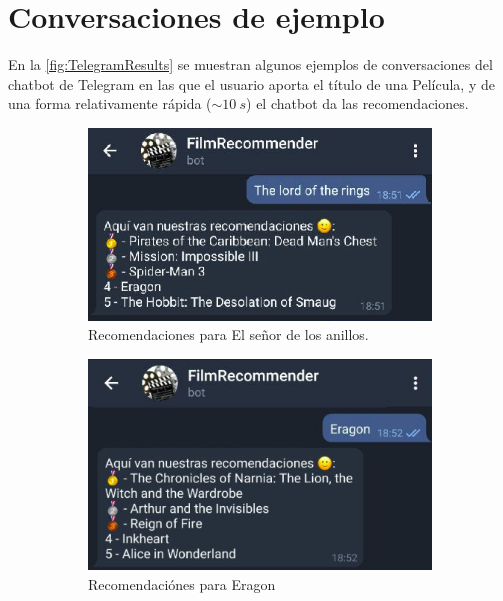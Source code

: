 \section{Conversaciones de ejemplo}

En la \autoref{fig:TelegramResults} se muestran algunos ejemplos de conversaciones del chatbot de Telegram en las que el usuario aporta el título de una Película, y de una forma relativamente rápida ($\sim 10\ s$) el chatbot da las recomendaciones.\\


\begin{figure}[H]
\begin{subfigure}{.5\textwidth}
  \centering
  \includegraphics[width=.9\linewidth]{contenido/imagenes/sc1.png}
  \caption{Recomendaciones para El señor de los anillos.}
  \label{fig:sc1}
\end{subfigure}%
\begin{subfigure}{.5\textwidth}
  \centering
  \includegraphics[width=.9\linewidth]{contenido/imagenes/sc2.png}
  \caption{Recomendaciónes para Eragon}
  \label{fig:sc2}
\end{subfigure}
\\
\begin{subfigure}{.5\textwidth}

\end{subfigure}
\end{figure}
